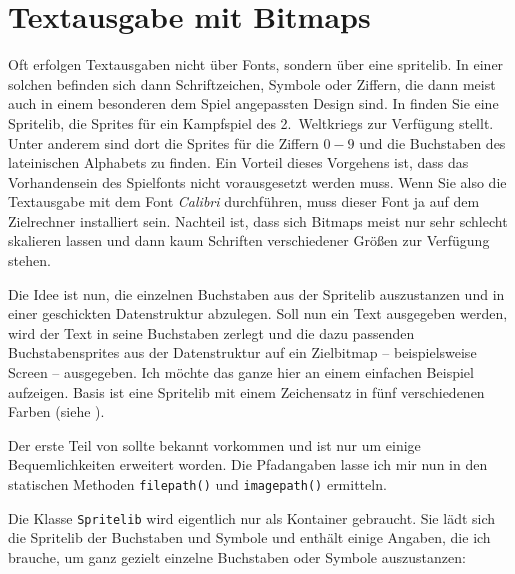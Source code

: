 \section{Textausgabe mit Bitmaps}
Oft erfolgen Textausgaben nicht über Fonts, sondern über eine \gls{spritelib}. In einer solchen befinden sich dann Schriftzeichen, Symbole oder Ziffern, die dann meist auch in einem besonderen dem Spiel angepassten Design sind. In  finden Sie eine Spritelib, die Sprites für ein Kampfspiel des 2.~Weltkriegs zur Verfügung stellt. Unter anderem sind dort die Sprites für die Ziffern $0-9$ und die Buchstaben des lateinischen Alphabets zu finden. Ein Vorteil dieses Vorgehens ist, dass das Vorhandensein des Spielfonts nicht vorausgesetzt werden muss. Wenn Sie also die Textausgabe mit dem Font \emph{Calibri} durchführen, muss dieser Font ja auf dem Zielrechner installiert sein. Nachteil ist, dass sich Bitmaps meist nur sehr schlecht skalieren lassen und dann kaum Schriften verschiedener Größen zur Verfügung stehen. 

Die Idee ist nun, die einzelnen Buchstaben aus der Spritelib auszustanzen und in einer geschickten Datenstruktur abzulegen. Soll nun ein Text ausgegeben werden, wird der Text in seine Buchstaben zerlegt und die dazu passenden Buchstabensprites aus der Datenstruktur auf ein Zielbitmap -- beispielsweise Screen -- ausgegeben. Ich möchte das ganze hier an einem einfachen Beispiel aufzeigen. Basis ist eine Spritelib mit einem Zeichensatz in fünf verschiedenen Farben (siehe ).


Der erste Teil von  sollte bekannt vorkommen und ist nur um einige Bequemlichkeiten erweitert worden. Die Pfadangaben lasse ich mir nun in den statischen Methoden \texttt{filepath()} und \texttt{imagepath()} ermitteln.


Die Klasse \texttt{Spritelib} wird eigentlich nur als Kontainer gebraucht. Sie lädt sich die Spritelib der Buchstaben und Symbole und enthält einige Angaben, die ich brauche, um ganz gezielt einzelne Buchstaben oder Symbole auszustanzen:

